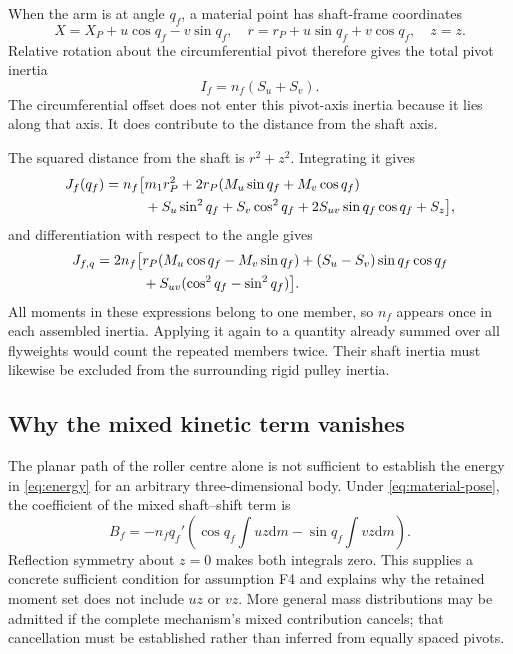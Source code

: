 \documentclass[11pt,letterpaper]{article}
\numberwithin{equation}{section}
\newcommand{\dd}{\mathrm{d}}
\begin{document}
When the arm is at angle $q_f$, a material point has shaft-frame coordinates
\begin{equation}
  X=X_P+u\cos q_f-v\sin q_f,
  \quad r=r_P+u\sin q_f+v\cos q_f,
  \quad z=z.
  \label{eq:material-pose}
\end{equation}
Relative rotation about the circumferential pivot therefore gives the total pivot inertia
\begin{equation}
  \boxed{I_f=n_f(S_u+S_v).}
  \label{eq:pivot-inertia}
\end{equation}
The circumferential offset does not enter this pivot-axis inertia because it lies along that axis. It does contribute to the distance from the shaft axis.

The squared distance from the shaft is $r^2+z^2$. Integrating it gives
\begin{align}
  J_f(q_f)=n_f\bigl[&m_1r_P^2
       +2r_P(M_u\sin q_f+M_v\cos q_f)\notag\\
       &+S_u\sin^2q_f+S_v\cos^2q_f
       +2S_{uv}\sin q_f\cos q_f+S_z\bigr],
       \label{eq:Jq}
\end{align}
and differentiation with respect to the angle gives
\begin{align}
  J_{f,q}=2n_f\bigl[&r_P(M_u\cos q_f-M_v\sin q_f)
       +(S_u-S_v)\sin q_f\cos q_f\notag\\
       &+S_{uv}(\cos^2q_f-\sin^2q_f)\bigr].
       \label{eq:J-angle-derivative}
\end{align}
All moments in these expressions belong to one member, so $n_f$ appears once in each assembled inertia. Applying it again to a quantity already summed over all flyweights would count the repeated members twice. Their shaft inertia must likewise be excluded from the surrounding rigid pulley inertia.

\subsection{Why the mixed kinetic term vanishes}

The planar path of the roller centre alone is not sufficient to establish the energy in \cref{eq:energy} for an arbitrary three-dimensional body. Under \cref{eq:material-pose}, the coefficient of the mixed shaft--shift term is
\begin{equation}
  B_f=-n_fq_f'\left(\cos q_f\int uz\dd m
                         -\sin q_f\int vz\dd m\right).
  \label{eq:B-fixed}
\end{equation}
Reflection symmetry about $z=0$ makes both integrals zero. This supplies a concrete sufficient condition for assumption F4 and explains why the retained moment set does not include $uz$ or $vz$. More general mass distributions may be admitted if the complete mechanism's mixed contribution cancels; that cancellation must be established rather than inferred from equally spaced pivots.
\end{document}
